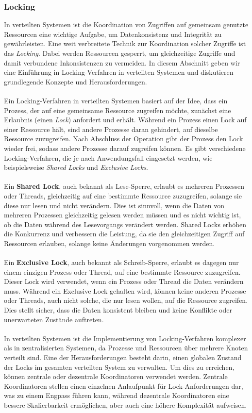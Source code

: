 \subsubsection{Locking}
In verteilten Systemen ist die Koordination von Zugriffen auf gemeinsam genutzte Ressourcen eine wichtige Aufgabe, um Datenkonsistenz und Integrität zu gewährleisten. Eine weit verbreitete Technik zur Koordination solcher Zugriffe ist das \textit{Locking}. Dabei werden Ressourcen gesperrt, um gleichzeitige Zugriffe und damit verbundene Inkonsistenzen zu vermeiden. In diesem Abschnitt geben wir eine Einführung in Locking-Verfahren in verteilten Systemen und diskutieren grundlegende Konzepte und Herausforderungen.
\\\\
Ein Locking-Verfahren in verteilten Systemen basiert auf der Idee, dass ein Prozess, der auf eine gemeinsame Ressource zugreifen möchte, zunächst eine Erlaubnis (einen \textit{Lock}) anfordert und erhält. Während ein Prozess einen Lock auf einer Ressource hält, sind andere Prozesse daran gehindert, auf dieselbe Ressource zuzugreifen. Nach Abschluss der Operation gibt der Prozess den Lock wieder frei, sodass andere Prozesse darauf zugreifen können. Es gibt verschiedene Locking-Verfahren, die je nach Anwendungsfall eingesetzt werden, wie beispielsweise \textit{Shared Locks} und \textit{Exclusive Locks}.
\\\\
Ein \textbf{Shared Lock}, auch bekannt als Lese-Sperre, erlaubt es mehreren Prozessen oder Threads, gleichzeitig auf eine bestimmte Ressource zuzugreifen, solange sie diese nur lesen und nicht verändern. Dies ist sinnvoll, wenn die Daten von mehreren Prozessen gleichzeitig gelesen werden müssen und es nicht wichtig ist, ob die Daten während des Lesevorgangs verändert werden. Shared Locks erhöhen die Konkurrenz und verbessern die Leistung, da sie den gleichzeitigen Zugriff auf Ressourcen erlauben, solange keine Änderungen vorgenommen werden.
\\\\
Ein \textbf{Exclusive Lock}, auch bekannt als Schreib-Sperre, erlaubt es dagegen nur einem einzigen Prozess oder Thread, auf eine bestimmte Ressource zuzugreifen. Dieser Lock wird verwendet, wenn ein Prozess oder Thread die Daten verändern muss. Während ein Exclusive Lock gehalten wird, können keine anderen Prozesse oder Threads, auch nicht solche, die nur lesen wollen, auf die Ressource zugreifen. Dies stellt sicher, dass die Daten konsistent bleiben und keine Konflikte oder unerwarteten Zustände auftreten.
\\\\
In verteilten Systemen ist die Implementierung von Locking-Verfahren komplexer als in zentralisierten Systemen, da Prozesse und Ressourcen über mehrere Knoten verteilt sind. Eine der Herausforderungen besteht darin, einen globalen Zustand der Locks im gesamten verteilten System zu verwalten. Um dies zu erreichen, können zentrale oder dezentrale Koordinatoren verwendet werden. Zentrale Koordinatoren stellen einen einzelnen Anlaufpunkt für Lock-Anforderungen dar, was zu einem Engpass führen kann, während dezentrale Koordinatoren eine bessere Skalierbarkeit ermöglichen, aber auch eine höhere Komplexität aufweisen.

